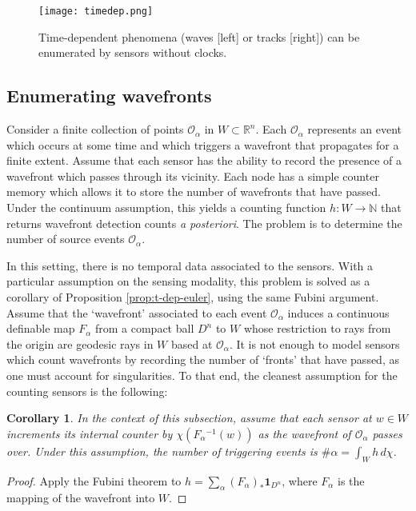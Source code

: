 \documentclass{psapm-l}
\newtheorem{corollary}[theorem]{Corollary}
\theoremstyle{definition}
\theoremstyle{remark}
\numberwithin{equation}{section}
\begin{document}
\begin{figure}[hbt]
\begin{center}
\texttt{[image: timedep.png]}
\caption{Time-dependent phenomena (waves [left] or tracks [right]) can be enumerated by sensors without clocks.}
\label{fig:t-dep}
\end{center}
\end{figure}

\subsection{Enumerating wavefronts}
Consider a finite collection of points ${{\mathcal O}}_\alpha$ in $W\subset{{\mathbb R}}^n$. Each ${{\mathcal O}}_\alpha$ represents an event which occurs at some time and which triggers a wavefront that propagates for a finite extent. Assume that each sensor has the ability to record the presence
of a wavefront which passes through its vicinity. Each node has a simple counter memory which allows it to store the number of wavefronts that have passed. Under the continuum assumption, this yields a counting function $h:W\to{{\mathbb N}}$ that returns wavefront detection counts {\em a posteriori}. The problem is to determine the number of source events ${{\mathcal O}}_\alpha$.

In this setting, there is no temporal data associated to the sensors. With a particular assumption on the sensing modality, this problem is solved as a corollary of Proposition \ref{prop:t-dep-euler}, using the same Fubini argument. Assume that the `wavefront' associated to each event ${{\mathcal O}}_\alpha$ induces a continuous definable map $F_\alpha$ from a compact ball $D^n$ to $W$ whose restriction to rays from the origin are geodesic rays in $W$ based at ${{\mathcal O}}_\alpha$. It is not enough to model sensors which count wavefronts by recording the number of `fronts' that have passed, as one must account for singularities. To that end, the cleanest assumption for the counting sensors is the following:

\begin{corollary}
\label{cor:wavefront}
In the context of this subsection, assume that each sensor at $w\in W$ increments its internal counter by $\chi(F_\alpha{^{-1}}(w))$ as the wavefront of ${{\mathcal O}}_\alpha$ passes over. Under this assumption, the number of triggering events is $\#\alpha = \int_W h\,d\chi$.
\end{corollary}
\begin{proof}
Apply the Fubini theorem to $h=\sum_\alpha (F_\alpha)_*{{\mathbf{1}}}_{D^n}$, where $F_\alpha$ is the mapping of the wavefront into $W$.
\end{proof}
\end{document}
